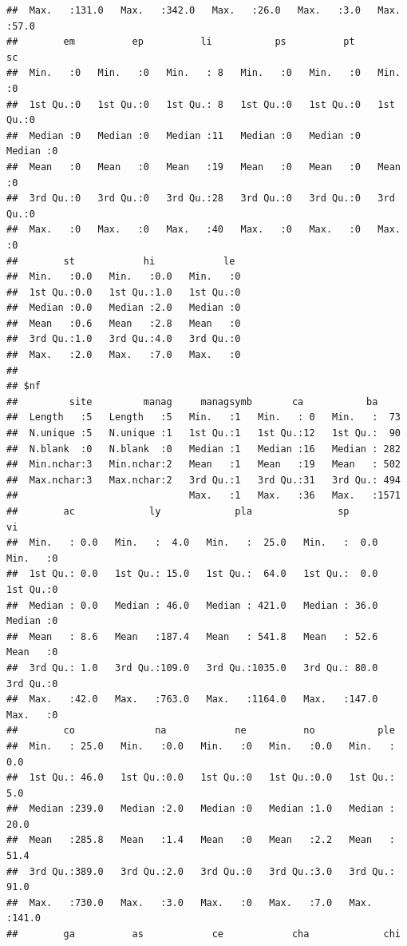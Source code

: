 \documentclass[
]{article}
\begin{document}
\begin{verbatim}
##  Max.   :131.0   Max.   :342.0   Max.   :26.0   Max.   :3.0   Max.   :57.0  
##        em          ep          li           ps          pt          sc   
##  Min.   :0   Min.   :0   Min.   : 8   Min.   :0   Min.   :0   Min.   :0  
##  1st Qu.:0   1st Qu.:0   1st Qu.: 8   1st Qu.:0   1st Qu.:0   1st Qu.:0  
##  Median :0   Median :0   Median :11   Median :0   Median :0   Median :0  
##  Mean   :0   Mean   :0   Mean   :19   Mean   :0   Mean   :0   Mean   :0  
##  3rd Qu.:0   3rd Qu.:0   3rd Qu.:28   3rd Qu.:0   3rd Qu.:0   3rd Qu.:0  
##  Max.   :0   Max.   :0   Max.   :40   Max.   :0   Max.   :0   Max.   :0  
##        st            hi            le   
##  Min.   :0.0   Min.   :0.0   Min.   :0  
##  1st Qu.:0.0   1st Qu.:1.0   1st Qu.:0  
##  Median :0.0   Median :2.0   Median :0  
##  Mean   :0.6   Mean   :2.8   Mean   :0  
##  3rd Qu.:1.0   3rd Qu.:4.0   3rd Qu.:0  
##  Max.   :2.0   Max.   :7.0   Max.   :0  
## 
## $nf
##         site         manag     managsymb       ca           ba      
##  Length   :5   Length   :5   Min.   :1   Min.   : 0   Min.   :  73  
##  N.unique :5   N.unique :1   1st Qu.:1   1st Qu.:12   1st Qu.:  90  
##  N.blank  :0   N.blank  :0   Median :1   Median :16   Median : 282  
##  Min.nchar:3   Min.nchar:2   Mean   :1   Mean   :19   Mean   : 502  
##  Max.nchar:3   Max.nchar:2   3rd Qu.:1   3rd Qu.:31   3rd Qu.: 494  
##                              Max.   :1   Max.   :36   Max.   :1571  
##        ac             ly             pla               sp              vi   
##  Min.   : 0.0   Min.   :  4.0   Min.   :  25.0   Min.   :  0.0   Min.   :0  
##  1st Qu.: 0.0   1st Qu.: 15.0   1st Qu.:  64.0   1st Qu.:  0.0   1st Qu.:0  
##  Median : 0.0   Median : 46.0   Median : 421.0   Median : 36.0   Median :0  
##  Mean   : 8.6   Mean   :187.4   Mean   : 541.8   Mean   : 52.6   Mean   :0  
##  3rd Qu.: 1.0   3rd Qu.:109.0   3rd Qu.:1035.0   3rd Qu.: 80.0   3rd Qu.:0  
##  Max.   :42.0   Max.   :763.0   Max.   :1164.0   Max.   :147.0   Max.   :0  
##        co              na            ne          no           ple       
##  Min.   : 25.0   Min.   :0.0   Min.   :0   Min.   :0.0   Min.   :  0.0  
##  1st Qu.: 46.0   1st Qu.:0.0   1st Qu.:0   1st Qu.:0.0   1st Qu.:  5.0  
##  Median :239.0   Median :2.0   Median :0   Median :1.0   Median : 20.0  
##  Mean   :285.8   Mean   :1.4   Mean   :0   Mean   :2.2   Mean   : 51.4  
##  3rd Qu.:389.0   3rd Qu.:2.0   3rd Qu.:0   3rd Qu.:3.0   3rd Qu.: 91.0  
##  Max.   :730.0   Max.   :3.0   Max.   :0   Max.   :7.0   Max.   :141.0  
##        ga          as            ce            cha             chi      

\end{verbatim}
\end{document}
